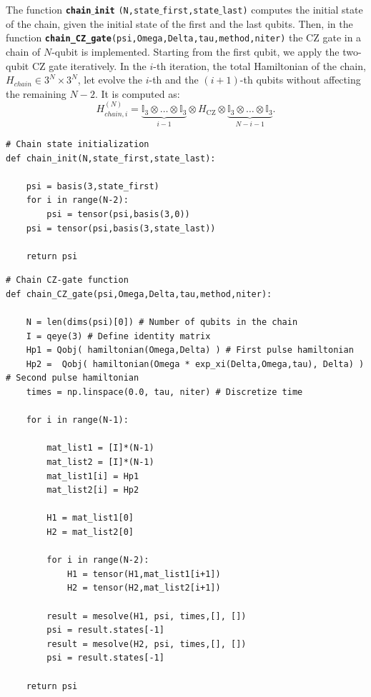 \documentclass[rmp,10pt,onecolumn,fleqn,notitlepage]{revtex4-1}
\begin{document}
The function {\bfseries\texttt{chain$\_$init}} \texttt{(N,state$\_$first,state$\_$last)} computes the initial state of the chain, given the initial state of the first and the last qubits. Then, in the function {\bfseries\texttt{chain\_CZ\_gate}}\texttt{(psi,Omega,Delta,tau,method,niter)} the CZ gate in a chain of $N$-qubit is implemented. 
Starting from the first qubit, we apply the two-qubit CZ gate iteratively. In the $i$-th iteration, the total Hamiltonian of the chain, $H_{chain} \in 3^N\times 3^N$, let evolve the $i$-th and the $(i+1)$-th qubits without affecting the remaining $N-2$. It is computed as:
\begin{equation}
    H_{chain,i}^{(N)} =  \underbrace{\mathbb{I}_3  \otimes \dots \otimes \mathbb{I}_3}_{i-1} \otimes H_{\text{CZ}} \otimes \underbrace{ \mathbb{I}_3  \otimes \dots \otimes \mathbb{I}_3}_{N-i-1}.
\end{equation}

\begin{lstlisting}[style=myPython]
# Chain state initialization
def chain_init(N,state_first,state_last):
    
    psi = basis(3,state_first) 
    for i in range(N-2):
        psi = tensor(psi,basis(3,0))
    psi = tensor(psi,basis(3,state_last))

    return psi
\end{lstlisting}

\begin{lstlisting}[style=myPython]
# Chain CZ-gate function
def chain_CZ_gate(psi,Omega,Delta,tau,method,niter):

    N = len(dims(psi)[0]) # Number of qubits in the chain
    I = qeye(3) # Define identity matrix
    Hp1 = Qobj( hamiltonian(Omega,Delta) ) # First pulse hamiltonian
    Hp2 =  Qobj( hamiltonian(Omega * exp_xi(Delta,Omega,tau), Delta) ) # Second pulse hamiltonian 
    times = np.linspace(0.0, tau, niter) # Discretize time
        
    for i in range(N-1):
        
        mat_list1 = [I]*(N-1)
        mat_list2 = [I]*(N-1)
        mat_list1[i] = Hp1
        mat_list2[i] = Hp2
        
        H1 = mat_list1[0]
        H2 = mat_list2[0]
        
        for i in range(N-2):
            H1 = tensor(H1,mat_list1[i+1])
            H2 = tensor(H2,mat_list2[i+1])
        
        result = mesolve(H1, psi, times,[], [])
        psi = result.states[-1]
        result = mesolve(H2, psi, times,[], [])
        psi = result.states[-1]
    
    return psi
\end{lstlisting}
\end{document}
